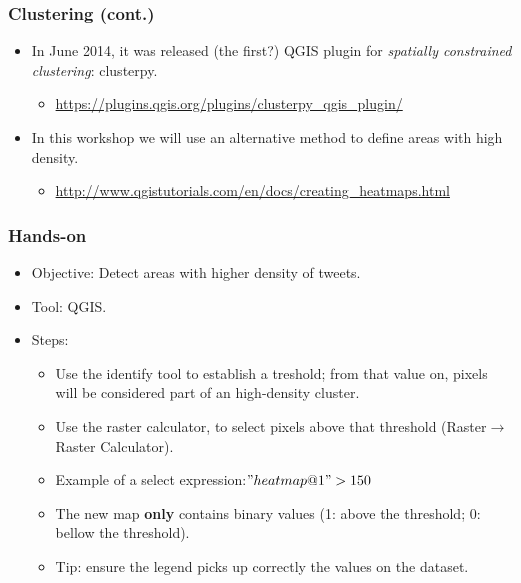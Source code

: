 \documentclass[hyperref={pdfpagelabels=true}]{beamer}
\begin{document}
\begin{frame}
\frametitle{Clustering (cont.)}

    \begin{itemize}
      \item<1->In June 2014, it was released (the first?) QGIS plugin for \textit{spatially constrained clustering}: clusterpy.
      \begin{itemize}
	\item<1->\url{https://plugins.qgis.org/plugins/clusterpy\_qgis\_plugin/}
      \end{itemize}          
      \item<1->In this workshop we will use an alternative method to define areas with high density.
      \begin{itemize}
	\item<1->\url{http://www.qgistutorials.com/en/docs/creating_heatmaps.html}
      \end{itemize}          
    \end{itemize}    

    
\end{frame}


\begin{frame}
\frametitle{Hands-on}
\begin{itemize}
  \item<1->Objective: Detect areas with higher density of tweets.
  \item<1->Tool: QGIS.
  \item<1->Steps:  
  \begin{itemize}
    \item<2->Use the identify tool to establish a treshold; from that value on, pixels will be considered part of an high-density cluster.  
    \item<2->Use the raster calculator, to select pixels above that threshold (Raster$\rightarrow$Raster Calculator).
    \item<2->Example of a select expression:$"heatmap@1">150$    
    \item<3->The new map \textbf{only} contains binary values (1: above the threshold; 0: bellow the threshold).
    \item<3->Tip: ensure the legend picks up correctly the values on the dataset.
  \end{itemize}    
\end{itemize}  
\end{frame}
\end{document}

